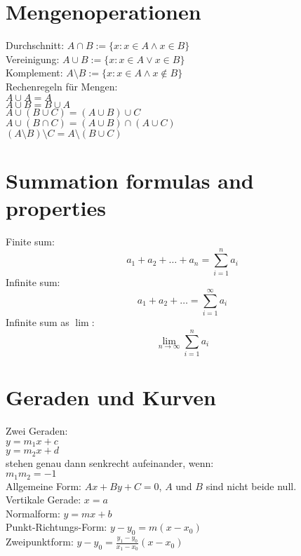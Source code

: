 \documentclass[a4paper, 10pt]{scrartcl}
\begin{document}
\setlength{\parindent}{0em}

\section*{Mengenoperationen}
Durchschnitt: $A\cap B := \{x: x\in A \wedge x\in B\}$\\
Vereinigung: $A\cup B := \{x: x\in A \vee x\in B\}$\\
Komplement: $A\setminus B := \{x: x\in A \wedge x\notin B\}$\\

Rechenregeln für Mengen:\\
$A\cup A = A$\\
$A\cup B = B\cup A$\\
$A\cup (B\cup C) = (A\cup B)\cup C$\\
$A\cup (B\cap C) = (A\cup B)\cap (A\cup C)$\\
$(A\setminus B)\setminus C = A\setminus (B\cup C)$\\

\section*{Summation formulas and properties}
Finite sum:
\[
a_{1} + a_{2} + \dots + a_{n} = \sum_{i=1}^{n}a_{i}
\]
Infinite sum:
\[
a_{1} + a_{2} + \dots = \sum_{i=1}^{\infty}a_{i}
\]
Infinite sum as $\lim$:\\
\[
\lim_{n\to\infty}\sum_{i=1}^{n}a_{i}
\]

\section*{Geraden und Kurven}
Zwei Geraden:\\
$y = m_{1}x + c$\\
$y = m_{2}x + d$\\
stehen genau dann senkrecht aufeinander, wenn:\\
$m_{1}m_{2} = -1$\\

Allgemeine Form: $Ax + By + C = 0$, $A$ und $B$ sind nicht beide null.\\
Vertikale Gerade: $x = a$\\
Normalform: $y = mx + b$\\
Punkt-Richtungs-Form: $y - y_{0} = m(x - x_{0})$\\

Zweipunktform: $y - y_{0} = \frac{y_{1} - y_{0}}{x_{1} - x_{0}}(x - x_{0})$\\
\end{document}
